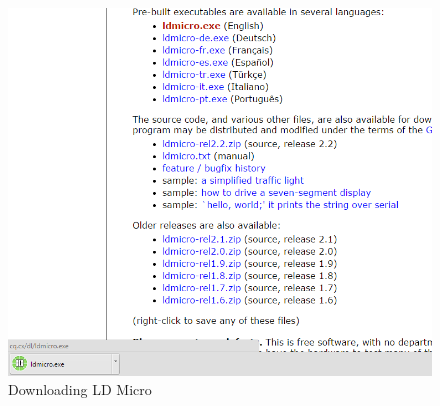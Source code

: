 \documentclass[12pt]{article}
\begin{document}
\begin{figure}[h!]
\centering
\includegraphics[scale=0.5]{screen.png}
\caption{Downloading LD Micro}
\end{figure}

\newpage
\end{document}
